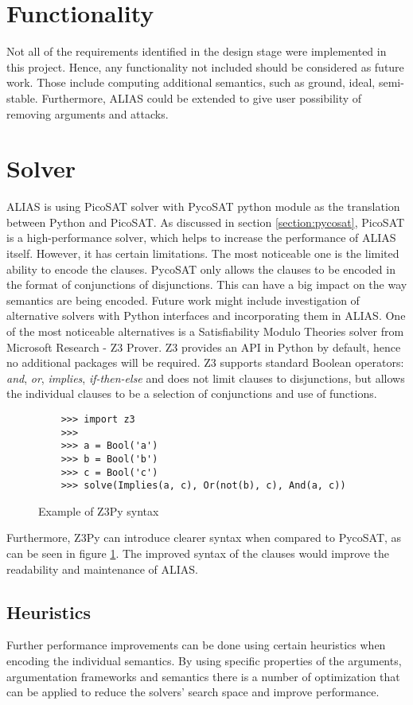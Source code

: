 \section{Functionality}
Not all of the requirements identified in the design stage were implemented in this project. Hence, any functionality not included should be considered as future work. Those include computing additional semantics, such as ground, ideal, semi-stable. Furthermore, ALIAS could be extended to give user possibility of removing arguments and attacks. 

\section{Solver}
ALIAS is using PicoSAT solver with PycoSAT python module as the translation between Python and PicoSAT. As discussed in section \ref{section:pycosat}, PicoSAT is a high-performance solver, which helps to increase the performance of ALIAS itself. However, it has certain limitations. The most noticeable one is the limited ability to encode the clauses. PycoSAT only allows the clauses to be encoded in the format of conjunctions of disjunctions. This can have a big impact on the way semantics are being encoded. Future work might include investigation of alternative solvers with Python interfaces and incorporating them in ALIAS. One of the most noticeable alternatives is a Satisfiability Modulo Theories solver from Microsoft Research - Z3 Prover. Z3 provides an API in Python by default, hence no additional packages will be required. Z3 supports standard Boolean operators: \textit{and}, \textit{or}, \textit{implies}, \textit{if-then-else} and does not limit clauses to disjunctions, but allows the individual clauses to be a selection of conjunctions and use of functions. 

\begin{figure}
	\begin{verbatim}
	>>> import z3
	>>>
	>>> a = Bool('a')
	>>> b = Bool('b')
	>>> c = Bool('c')
	>>> solve(Implies(a, c), Or(not(b), c), And(a, c))
	\end{verbatim}
	\caption{Example of Z3Py syntax}
	\label{fig:z3}
\end{figure}

Furthermore, Z3Py can introduce clearer syntax when compared to PycoSAT, as can be seen in figure \ref{fig:z3}. The improved syntax of the clauses would improve the readability and maintenance of ALIAS. 

\subsection{Heuristics}
Further performance improvements can be done using certain heuristics when encoding the individual semantics. By using specific properties of the arguments, argumentation frameworks and semantics there is a number of optimization that can be applied to reduce the solvers' search space and improve performance.

